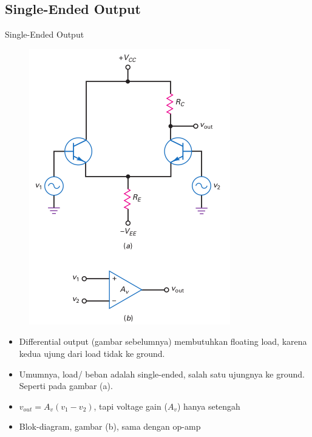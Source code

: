 \documentclass[aspectratio=169]{beamer}
\begin{document}
\subsection{Single-Ended Output}
\begin{frame}{Single-Ended Output}
	\begin{multicols}{2}
		\begin{figure}
			\centering
			\includegraphics[height=0.8\textheight]{gambar/01.diff-amp/01.diferential_input_single_ended}
		\end{figure}
		\columnbreak
		\begin{itemize}
			\item Differential output (gambar sebelumnya) membutuhkan floating load, karena kedua ujung dari load tidak ke ground.
			\item Umumnya, load/ beban adalah single-ended, salah satu ujungnya ke ground. Seperti pada gambar (a).
			\item $ v_{out} = A_v (v_1 - v_2) $, tapi voltage gain ($ A_v $) hanya setengah
			\item Blok-diagram, gambar (b), sama dengan op-amp
		\end{itemize}
	\end{multicols}
\end{frame}
\end{document}
